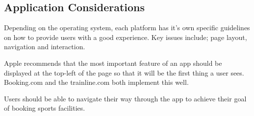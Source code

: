 \subsection{Application Considerations}
\label{sub:application_considerations}

Depending on the operating system, each platform has it's own specific
guidelines on how to provide users with a good experience. Key issues include;
page layout, navigation and interaction.

Apple recommends that the most important feature of an app should be displayed
at the top-left of the page so that it will be the first thing a user
sees\cite{HIGApple2013}.  Booking.com and the trainline.com both implement this
well\cite{BookingcomIOS}.

Users should be able to navigate their way through the app to achieve their
goal of booking sports facilities.

